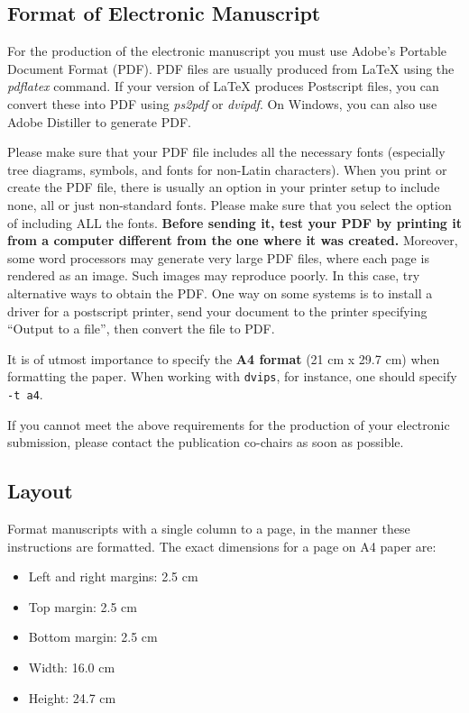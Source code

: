 \documentclass[11pt]{article}
\begin{document}
\subsection{Format of Electronic Manuscript}
\label{sect:pdf}

For the production of the electronic manuscript you must use Adobe's
Portable Document Format (PDF). PDF files are usually produced from
\LaTeX{} using the \textit{pdflatex} command. If your version of
\LaTeX{} produces Postscript files, you can convert these into PDF
using \textit{ps2pdf} or \textit{dvipdf}. On Windows, you can also use
Adobe Distiller to generate PDF.

Please make sure that your PDF file includes all the necessary fonts
(especially tree diagrams, symbols, and fonts for non-Latin characters). 
When you print or create the PDF file, there is usually
an option in your printer setup to include none, all or just
non-standard fonts.  Please make sure that you select the option of
including ALL the fonts. \textbf{Before sending it, test your PDF by
  printing it from a computer different from the one where it was
  created.} Moreover, some word processors may generate very large PDF
files, where each page is rendered as an image. Such images may
reproduce poorly. In this case, try alternative ways to obtain the
PDF. One way on some systems is to install a driver for a postscript
printer, send your document to the printer specifying ``Output to a
file'', then convert the file to PDF.

It is of utmost importance to specify the \textbf{A4 format} (21 cm
x 29.7 cm) when formatting the paper. When working with
{\tt dvips}, for instance, one should specify {\tt -t a4}.

If you cannot meet the above requirements
for the
production of your electronic submission, please contact the
publication co-chairs as soon as possible.


\subsection{Layout}
\label{ssec:layout}

Format manuscripts with a single column to a page, in the manner these
instructions are formatted. The exact dimensions for a page on A4
paper are:

\begin{itemize}
\item Left and right margins: 2.5 cm
\item Top margin: 2.5 cm
\item Bottom margin: 2.5 cm
\item Width: 16.0 cm
\item Height: 24.7 cm
\end{itemize}
\end{document}
